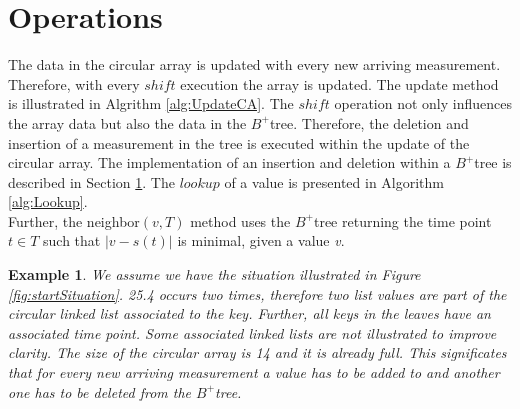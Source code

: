 \documentclass[abstracton,12pt]{scrreprt}
\newtheorem{example}{Example}
\begin{document}
\section{Operations}
\label{sec:OperationsOnBTree}
The data in the circular array is updated with every new arriving measurement. Therefore, with every $shift$ execution the array is updated. The update method is illustrated in Algrithm \ref{alg:UpdateCA}. The $shift$ operation not only influences the array data but also the data in the $B^+$tree. Therefore, the deletion and insertion of a measurement in the tree is executed within the update of the circular array. The implementation of an insertion and deletion within a $B^+$tree is described in Section \ref{sec:OperationsOnBTree}. The $lookup$ of a value is presented in Algorithm \ref{alg:Lookup}.
\\Further, the neighbor$(v,T)$ method uses the $B^+$tree returning the time point $t \in T$ such that $|v-s(t)|$ is minimal, given a value \emph{v}.

\begin{example}
We assume we have the situation illustrated in Figure \ref{fig:startSituation}. 25.4 occurs two times, therefore two list values are part of the circular linked list associated to the key. Further, all keys in the leaves have an associated time point. Some associated linked lists are not illustrated to improve clarity. The size of the circular array is 14 and it is already full. This significates that for every new arriving measurement a value has to be added to and another one has to be deleted from the $B^+$tree. 
\end{example}
\end{document}
